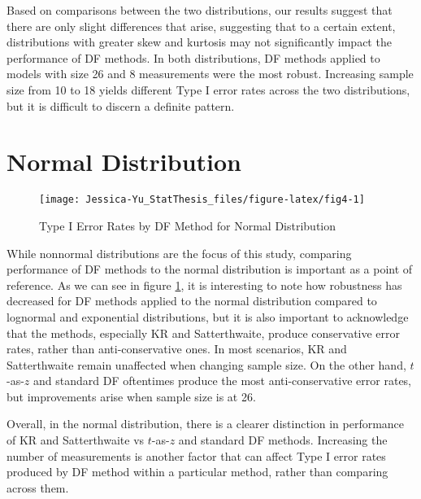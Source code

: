 \documentclass[12pt, twoside]{amherstthesis}
\begin{document}
Based on comparisons between the two distributions, our results suggest that there are only slight differences that arise, suggesting that to a certain extent, distributions with greater skew and kurtosis may not significantly impact the performance of DF methods. In both distributions, DF methods applied to models with size 26 and 8 measurements were the most robust. Increasing sample size from 10 to 18 yields different Type I error rates across the two distributions, but it is difficult to discern a definite pattern.

\hypertarget{normal-distribution}{%
\section{Normal Distribution}\label{normal-distribution}}
\begin{figure}

{\centering \texttt{[image: Jessica-Yu\_StatThesis\_files/figure-latex/fig4-1]} 

}

\caption{Type I Error Rates by DF Method for Normal Distribution}\label{fig:fig4}
\end{figure}
While nonnormal distributions are the focus of this study, comparing performance of DF methods to the normal distribution is important as a point of reference. As we can see in figure \ref{fig:fig4}, it is interesting to note how robustness has decreased for DF methods applied to the normal distribution compared to lognormal and exponential distributions, but it is also important to acknowledge that the methods, especially KR and Satterthwaite, produce conservative error rates, rather than anti-conservative ones. In most scenarios, KR and Satterthwaite remain unaffected when changing sample size. On the other hand, \(t\)-as-\(z\) and standard DF oftentimes produce the most anti-conservative error rates, but improvements arise when sample size is at 26.

Overall, in the normal distribution, there is a clearer distinction in performance of KR and Satterthwaite vs \(t\)-as-\(z\) and standard DF methods. Increasing the number of measurements is another factor that can affect Type I error rates produced by DF method within a particular method, rather than comparing across them.
\end{document}
